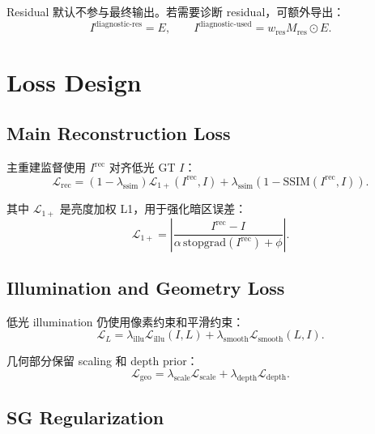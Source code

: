 \documentclass[11pt]{article}
\begin{document}
Residual 默认不参与最终输出。若需要诊断 residual，可额外导出：
\begin{equation}
    I^{\text{diagnostic-res}} = E,
    \qquad
    I^{\text{diagnostic-used}} = w_{\text{res}}M_{\text{res}}\odot E.
\end{equation}

\section{Loss Design}

\subsection{Main Reconstruction Loss}

主重建监督使用 $I^{\text{rec}}$ 对齐低光 GT $I$：
\begin{equation}
    \mathcal{L}_{\text{rec}}
    =
    (1-\lambda_{\text{ssim}})
    \mathcal{L}_{1+}
    \left(
        I^{\text{rec}}, I
    \right)
    +
    \lambda_{\text{ssim}}
    \left(
        1 - \mathrm{SSIM}(I^{\text{rec}}, I)
    \right).
\end{equation}

其中 $\mathcal{L}_{1+}$ 是亮度加权 L1，用于强化暗区误差：
\begin{equation}
    \mathcal{L}_{1+}
    =
    \left|
        \frac{
            I^{\text{rec}} - I
        }{
            \alpha \, \mathrm{stopgrad}(I^{\text{rec}}) + \phi
        }
    \right|.
\end{equation}

\subsection{Illumination and Geometry Loss}

低光 illumination 仍使用像素约束和平滑约束：
\begin{equation}
    \mathcal{L}_{L}
    =
    \lambda_{\text{illu}}
    \mathcal{L}_{\text{illu}}(I, L)
    +
    \lambda_{\text{smooth}}
    \mathcal{L}_{\text{smooth}}(L, I).
\end{equation}

几何部分保留 scaling 和 depth prior：
\begin{equation}
    \mathcal{L}_{\text{geo}}
    =
    \lambda_{\text{scale}}
    \mathcal{L}_{\text{scale}}
    +
    \lambda_{\text{depth}}
    \mathcal{L}_{\text{depth}}.
\end{equation}

\subsection{SG Regularization}
\end{document}
